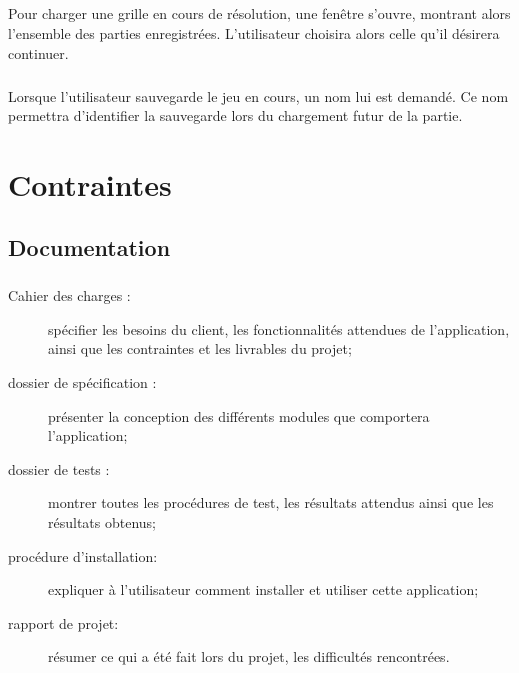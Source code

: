 	\paragraph*{}
	Pour charger une grille en cours de résolution, une fenêtre s'ouvre, montrant alors l'ensemble des parties enregistrées. L'utilisateur choisira alors celle qu'il désirera continuer.
	\paragraph*{}
	Lorsque l'utilisateur sauvegarde le jeu en cours, un nom lui est demandé. Ce nom permettra d'identifier la sauvegarde lors du chargement futur de la partie.




\chapter{Contraintes}


\section{Documentation}
	\paragraph*{}
	\begin{description}
		\item[Cahier des charges :] spécifier les besoins du client, les fonctionnalités attendues de l’application, ainsi que les contraintes et les livrables du projet;
		\item[dossier de spécification :] présenter la conception des différents modules que comportera l’application;
		\item[dossier de tests :] montrer toutes les procédures de test, les résultats attendus ainsi que les résultats obtenus;
		\item[procédure d'installation:] expliquer à l’utilisateur comment installer et utiliser cette application;
		\item[rapport de projet:] résumer ce qui a été fait lors du projet, les difficultés rencontrées.
	\end{description}


